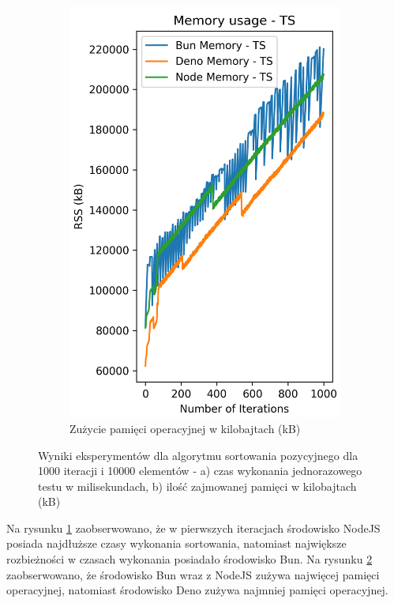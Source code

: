 \begin{figure}[H]
\begin{subfigure}[b]{0.42\textwidth}
    \label{fig:radix_sorting_e4_ts_time}
  \end{subfigure}
  \begin{subfigure}[b]{0.42\textwidth}
    \centering
    \includegraphics[width=\textwidth]{Figures/sorting/sorting_radix_1000_10000_ts_memory.png}
    \caption{Zużycie pamięci operacyjnej w kilobajtach (kB)}
    \label{fig:radix_sorting_e4_ts_memory}
  \end{subfigure}
  \hfill
  \caption{Wyniki eksperymentów dla algorytmu sortowania pozycyjnego dla 1000 iteracji i 10000 elementów - a) czas wykonania jednorazowego testu w milisekundach, b) ilość zajmowanej pamięci w kilobajtach (kB)}
  \label{fig:radix_sorting_e4_ts}
\end{figure}

Na rysunku \ref{fig:radix_sorting_e4_ts_time} zaobserwowano, że w pierwszych iteracjach środowisko NodeJS posiada najdłuższe czasy wykonania sortowania, natomiast największe rozbieżności w czasach wykonania posiadało środowisko Bun. Na rysunku \ref{fig:radix_sorting_e4_ts_memory} zaobserwowano, że środowisko Bun wraz z NodeJS zużywa najwięcej pamięci operacyjnej, natomiast środowisko Deno zużywa najmniej pamięci operacyjnej.

